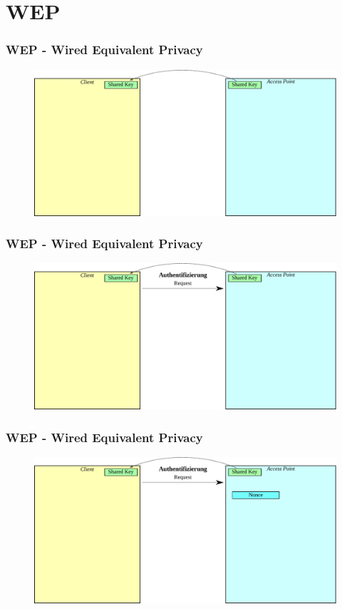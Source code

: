 \documentclass{beamer}
\begin{document}
\section{WEP}
\begin{frame}
\frametitle{WEP - Wired Equivalent Privacy}
\begin{figure}
	\includegraphics[width=1.0\linewidth]{figures/WEP_start.pdf}
\end{figure}
\end{frame}

\begin{frame}
\frametitle{WEP - Wired Equivalent Privacy}
\begin{figure}
	\includegraphics[width=1.0\linewidth]{figures/WEP_auth_1.pdf}
\end{figure}
\end{frame}

\begin{frame}
\frametitle{WEP - Wired Equivalent Privacy}
\begin{figure}
	\includegraphics[width=1.0\linewidth]{figures/WEP_auth_2.pdf}
\end{figure}
\end{frame}
\end{document}
